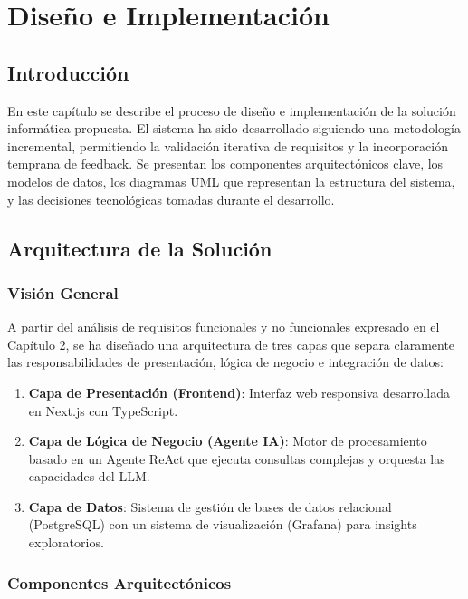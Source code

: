 \documentclass[11pt, a4paper]{report}
\begin{document}
\chapter{Diseño e Implementación}
\label{cap:diseño_implementacion}

\section{Introducción}

En este capítulo se describe el proceso de diseño e implementación de la solución informática propuesta. El sistema ha sido desarrollado siguiendo una metodología incremental, permitiendo la validación iterativa de requisitos y la incorporación temprana de feedback. Se presentan los componentes arquitectónicos clave, los modelos de datos, los diagramas UML que representan la estructura del sistema, y las decisiones tecnológicas tomadas durante el desarrollo.

\section{Arquitectura de la Solución}

\subsection{Visión General}

A partir del análisis de requisitos funcionales y no funcionales expresado en el Capítulo 2, se ha diseñado una arquitectura de tres capas que separa claramente las responsabilidades de presentación, lógica de negocio e integración de datos:

\begin{enumerate}
    \item \textbf{Capa de Presentación (Frontend)}: Interfaz web responsiva desarrollada en Next.js con TypeScript.
    \item \textbf{Capa de Lógica de Negocio (Agente IA)}: Motor de procesamiento basado en un Agente ReAct que ejecuta consultas complejas y orquesta las capacidades del LLM.
    \item \textbf{Capa de Datos}: Sistema de gestión de bases de datos relacional (PostgreSQL) con un sistema de visualización (Grafana) para insights exploratorios.
\end{enumerate}

\subsection{Componentes Arquitectónicos}
\end{document}
